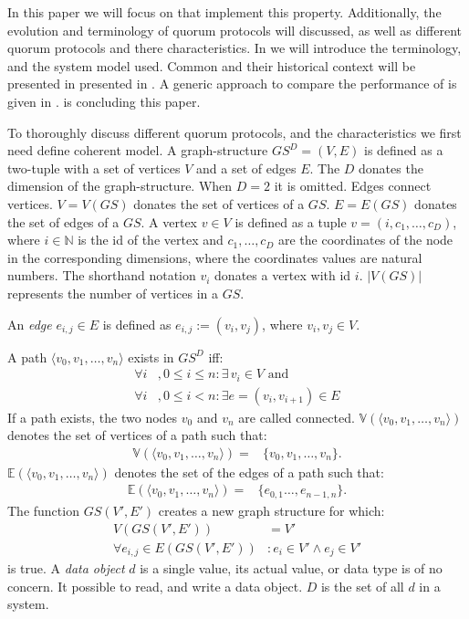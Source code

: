 \documentclass[conference]{IEEEtran}
\begin{document}
In this paper we will focus on  that implement this  property.
Additionally, the evolution and terminology of quorum protocols will
discussed, as well as different quorum protocols and there characteristics.
In  we will introduce the terminology, and the system
model used.
Common  and their historical context will be presented in presented
in .
A generic approach to compare the performance of  is given in
.
 is concluding this paper.

To thoroughly discuss different quorum protocols, and the characteristics we
first need define coherent model.
A graph-structure \(GS^{D} = (V,E)\) is defined as a two-tuple with a set of vertices \(V\) and
a set of edges \(E\).
The \(D\) donates the dimension of the graph-structure.
When \(D = 2\) it is omitted.
Edges connect vertices.
\(V = V(GS)\) donates the set of vertices of a \(GS\).
\(E = E(GS)\) donates the set of edges of a \(GS\).
A vertex \(v \in V\) is defined as a tuple \(v = (i,c_1, \dots, c_{D})\), where 
\(i \in \mathbb{N}\) is the id of the vertex and \(c_1, \dots, c_{D}\) are
the coordinates of the node in the corresponding dimensions, where the
coordinates values are natural numbers.
The shorthand notation \(v_i\) donates a vertex with id \(i\).
\(|V(GS)|\) represents the number of vertices in a \(GS\).

An \emph{edge} \(e_{i,j} \in E\) is defined as \(e_{i,j} := (v_i, v_j)\), where
\(v_i, v_j \in V\).

A path \(\langle v_0, v_1, \dots, v_n \rangle\) exists in \(GS^D\) iff:
\begin{align}
\forall i &, 0 \le i \le n : \exists\,v_i \in V \text{ and }\\
\forall i &, 0 \le i < n : \exists e = (v_i,v_{i+1}) \in E 
\end{align}
If a path exists, the two nodes \(v_0\) and \(v_n\) are called connected.
\(\mathbb{V}(\langle v_0, v_1, \dots, v_n \rangle )\) denotes the set of vertices of
a path such that:
\begin{align}
	\mathbb{V}(\langle v_0, v_1, \dots, v_n \rangle ) =& \{v_0, v_1, \dots, v_n\}.
\end{align}
\(\mathbb{E}(\langle v_0, v_1, \dots, v_n \rangle )\) denotes the set of the
edges of a path such that:
\begin{align}
	\mathbb{E}(\langle v_0, v_1, \dots, v_n \rangle ) =& \{e_{0,1}\dots, e_{n-1,n}\}.
\end{align}
The function \(GS(V',E')\) creates a new graph structure for which:
\begin{align}
	V(GS(V',E')) &= V'\\
	\forall e_{i,j} \in E(GS(V',E')) &: e_i \in V' \land e_j \in V'
\end{align}
is true.
A \emph{data object} \(d\) is a single value, its actual value, or data type is of
no concern.
It possible to read, and write a data object.
\(D\) is the set of all \(d\) in a system.
\end{document}
